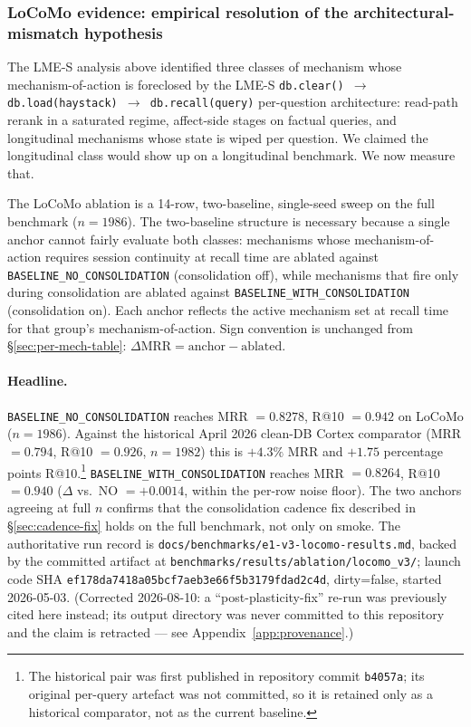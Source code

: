 \documentclass[11pt]{article}
\begin{document}
\subsubsection{LoCoMo evidence: empirical resolution of the architectural-mismatch hypothesis}
\label{sec:locomo-evidence}
\label{sec:locomo-forthcoming}

The LME-S analysis above identified three classes of mechanism whose
mechanism-of-action is foreclosed by the LME-S
\texttt{db.clear() $\to$ db.load(haystack) $\to$ db.recall(query)}
per-question architecture: read-path rerank in a saturated regime,
affect-side stages on factual queries, and longitudinal mechanisms
whose state is wiped per question.  We claimed the longitudinal class
would show up on a longitudinal benchmark.  We now measure that.

The LoCoMo ablation is a 14-row, two-baseline, single-seed sweep on
the full benchmark ($n = 1986$).  The two-baseline structure is
necessary because a single anchor cannot fairly evaluate both
classes: mechanisms whose mechanism-of-action requires session
continuity at recall time are ablated against
\texttt{BASELINE\_NO\_CONSOLIDATION} (consolidation off), while
mechanisms that fire only during consolidation are ablated against
\texttt{BASELINE\_WITH\_CONSOLIDATION} (consolidation on).  Each
anchor reflects the active mechanism set at recall time for that
group's mechanism-of-action.  Sign convention is unchanged from
\S\ref{sec:per-mech-table}: $\Delta\text{MRR} = \text{anchor} -
\text{ablated}$.

\paragraph{Headline.}  \texttt{BASELINE\_NO\_CONSOLIDATION} reaches
MRR $= 0.8278$, R@10 $= 0.942$ on LoCoMo ($n = 1986$).  Against the
historical April 2026 clean-DB Cortex comparator (MRR $= 0.794$,
R@10 $= 0.926$, $n = 1982$) this is $+4.3\%$ MRR and $+1.75$
percentage points R@10.\footnote{The historical pair was first
published in repository commit \texttt{b4057a}; its original
per-query artefact was not committed, so it is retained only as a
historical comparator, not as the current baseline.}
\texttt{BASELINE\_WITH\_CONSOLIDATION} reaches MRR $= 0.8264$,
R@10 $= 0.940$ ($\Delta$ vs.\ NO $= +0.0014$, within the per-row
noise floor).  The two anchors agreeing at full $n$ confirms that the
consolidation cadence fix described in \S\ref{sec:cadence-fix} holds
on the full benchmark, not only on smoke.  The authoritative run
record is \texttt{docs/benchmarks/e1-v3-locomo-results.md}, backed by
the committed artifact at \texttt{benchmarks/results/ablation/locomo\_v3/};
launch code SHA \texttt{ef178da7418a05bcf7aeb3e66f5b3179fdad2c4d},
dirty=false, started 2026-05-03.  (Corrected 2026-08-10: a
``post-plasticity-fix'' re-run was previously cited here instead; its
output directory was never committed to this repository and the claim
is retracted — see Appendix~\ref{app:provenance}.)
\end{document}
